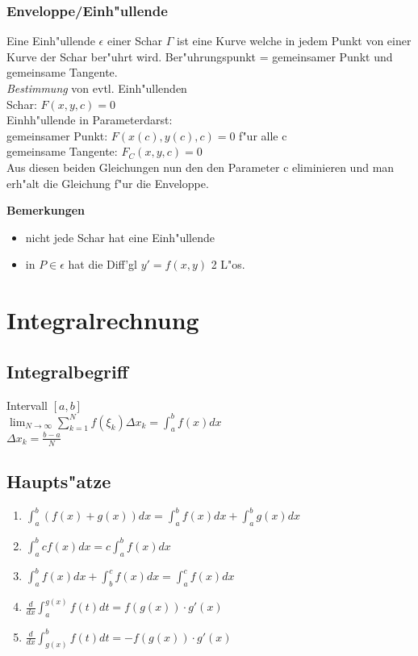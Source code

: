 \documentclass[10pt, a4paper, twocolumn]{scrartcl}
\begin{document}
\subsubsection{Enveloppe/Einh"ullende}

Eine Einh"ullende $\epsilon$ einer Schar $\Gamma$ ist eine Kurve welche in jedem Punkt von einer Kurve der Schar ber"uhrt wird. Ber"uhrungspunkt = gemeinsamer Punkt und gemeinsame Tangente.\\

\textit{Bestimmung} von evtl. Einh"ullenden\\
Schar: $F(x,y,c)=0$\\
Einhh"ullende in Parameterdarst:\\
gemeinsamer Punkt: $F(x(c),y(c),c)=0$ f"ur alle c\\
gemeinsame Tangente: $F_C(x,y,c)=0$\\
Aus diesen beiden Gleichungen nun den den Parameter c eliminieren und man erh"alt die Gleichung f"ur die Enveloppe.

\textbf{Bemerkungen}
\begin{itemize}
 \item nicht jede Schar hat eine Einh"ullende
 \item in $P\in \epsilon$ hat die Diff'gl $y'=f(x,y)$ 2 L"os.
\end{itemize}


\section{Integralrechnung}

\subsection{Integralbegriff}

Intervall $[a,b]$\\
$\lim_{N\to\infty} \sum^N_{k=1} f(\xi_k)\Delta x_k = \int^b_a f(x) dx$\\
$\Delta x_k =\frac{b-a}{N}$

\subsection{Haupts"atze}

\begin{enumerate}
 \item $\int^b_a(f(x)+g(x))dx=\int^b_a f(x)dx + \int^b_a g(x)dx$
 \item $\int^b_a c f(x)dx = c\int^b_a f(x) dx$
 \item $\int^b_a f(x)dx + \int^c_b f(x) dx = \int^c_a f(x)dx$
 \item $\frac{d}{dx}\int^{g(x)}_a f(t)dt=f(g(x))\cdotp g'(x)$
 \item $\frac{d}{dx}\int^{b}_{g(x)} f(t)dt=-f(g(x))\cdotp g'(x)$
\end{enumerate}
\end{document}
